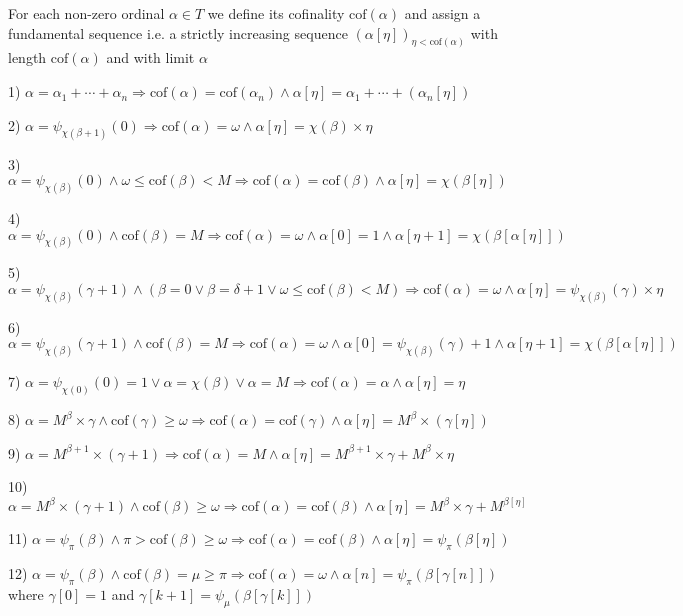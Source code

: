 \documentclass[10pt]{article}
\begin{document}
For each non-zero ordinal \(\alpha\in T\) we define its cofinality \(\text{cof}(\alpha)\) and assign a fundamental sequence i.e. a strictly increasing sequence \((\alpha[\eta])_{\eta<\text{cof}(\alpha)}\) with length \(\text{cof}(\alpha)\) and with limit \(\alpha\)

1) \(\alpha=\alpha_1+\cdots+\alpha_n\Rightarrow\text{cof}(\alpha)=\text{cof}(\alpha_n)\wedge\alpha[\eta]=\alpha_1+\cdots+(\alpha_n[\eta])\)

2) \(\alpha=\psi_{\chi(\beta+1)}(0)\Rightarrow\text{cof}(\alpha)=\omega\wedge\alpha[\eta]=\chi(\beta)\times \eta\)

3) \(\alpha=\psi_{\chi(\beta)}(0)\wedge\omega\le\text{cof}(\beta)<M\Rightarrow\text{cof}(\alpha)=\text{cof}(\beta)\wedge\alpha[\eta]=\chi(\beta[\eta])\)

4) \(\alpha=\psi_{\chi(\beta)}(0)\wedge\text{cof}(\beta)=M\Rightarrow\text{cof}(\alpha)=\omega\wedge\alpha[0]=1\wedge\alpha[\eta+1]=\chi(\beta[\alpha[\eta]])\)

5)  \(\alpha=\psi_{\chi(\beta)}(\gamma+1)\wedge(\beta=0\vee\beta=\delta+1\vee\omega\le\text{cof}(\beta)<M)\Rightarrow\text{cof}(\alpha)=\omega\wedge\alpha[\eta]=\psi_{\chi(\beta)}(\gamma)\times \eta\)

6)  \(\alpha=\psi_{\chi(\beta)}(\gamma+1)\wedge\text{cof}(\beta)=M\Rightarrow\text{cof}(\alpha)=\omega\wedge\alpha[0]=\psi_{\chi(\beta)}(\gamma)+1\wedge\alpha[\eta+1]=\chi(\beta[\alpha[\eta]])\)

7)  \(\alpha=\psi_{\chi(0)}(0)=1\vee\alpha=\chi(\beta)\vee\alpha=M\Rightarrow\text{cof}(\alpha)=\alpha\wedge\alpha[\eta]=\eta\)

8) \(\alpha=M^{\beta}\times\gamma \wedge \text{cof} (\gamma)\geq\omega \Rightarrow \text{cof} (\alpha)= \text{cof}(\gamma)\wedge\alpha[\eta]=M^{\beta}\times(\gamma[\eta])\)

9) \(\alpha=M^{\beta+1}\times(\gamma+1) \Rightarrow \text{cof} (\alpha)=M \wedge\alpha[\eta]=M^{\beta+1}\times\gamma+M^\beta\times\eta\)

10) \(\alpha=M^\beta\times(\gamma+1) \wedge\text{cof}(\beta)\geq\omega \Rightarrow \text{cof}(\alpha)= \text{cof}(\beta) \wedge \alpha[\eta]=M^\beta\times\gamma+M^{\beta[\eta]}\)

11) \(\alpha=\psi_\pi(\beta) \wedge \pi>\text{cof}(\beta)\geq\omega \Rightarrow \text{cof} (\alpha)= \text{cof}(\beta) \wedge \alpha[\eta]=\psi_\pi(\beta[\eta])\)

12) \(\alpha=\psi_\pi(\beta) \wedge \text{cof}(\beta)=\mu\geq\pi \Rightarrow \text{cof} (\alpha)=\omega \wedge \alpha[n]=\psi _\pi(\beta[\gamma[n]])\) where  \(\gamma[0]=1\) and  \(\gamma[k+1]=\psi_\mu(\beta[\gamma[k]])\)
\end{document}
